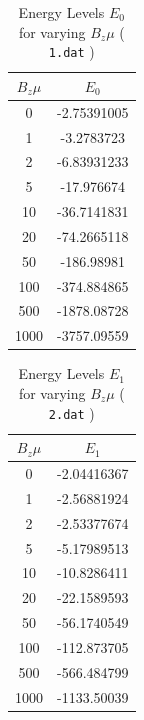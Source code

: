 \documentclass[a4paper]{IEEEtran}
\begin{document}
    \begin{table}
        \caption{Energy Levels $E_0$ for varying $B_z\mu$ ( \texttt{1.dat} )}
        \label{tbl:energy-1}
        \begin{center}
        \begin{tabular}{|c|c|} \hline
        $B_z\mu$ & $E_0$  \\ \hline \hline
        0    & -2.75391005 \\ \hline
        1    & -3.2783723     \\ \hline 
        2    & -6.83931233  \\ \hline 
        5    & -17.976674 \\ \hline 
        10   & -36.7141831\\ \hline 
        20   & -74.2665118\\ \hline 
        50   & -186.98981\\ \hline 
        100  & -374.884865\\ \hline 
        500  & -1878.08728\\ \hline 
        1000 & -3757.09559\\ \hline 
        \end{tabular}
        \end{center}
    \end{table}

    \begin{table} 
        \caption{Energy Levels $E_1$ for varying $B_z\mu$ ( \texttt{2.dat} ) }
        \label{tbl:energy-2} 
        \begin{center}
        \begin{tabular}{|c|c|} \hline
        $B_z\mu$ & $E_1$  \\ \hline \hline
        0    & -2.04416367 \\ \hline
        1    & -2.56881924 \\ \hline
        2    & -2.53377674 \\ \hline
        5    & -5.17989513 \\ \hline
        10   & -10.8286411 \\ \hline
        20   & -22.1589593 \\ \hline
        50   & -56.1740549 \\ \hline
        100  & -112.873705 \\ \hline
        500  & -566.484799  \\ \hline
        1000 & -1133.50039 \\ \hline
        \end{tabular}
        \end{center}
    \end{table} 
\end{document}
